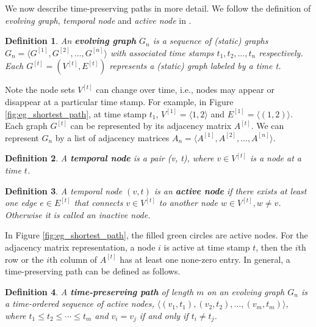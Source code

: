 \documentclass[12pt]{article}
\newtheorem{definition}{Definition}
\theoremstyle{definition}
\begin{document}
We now describe time-preserving paths in more detail. We follow the definition of
\emph{evolving graph}, \emph{temporal node} and \emph{active node} in \cite{chen16}.

\begin{definition}
  An \textbf{evolving graph} $G_n$ is a sequence of (static) graphs
$G_n = \langle G^{[1]}, G^{[2]},  \ldots ,G^{[n]} \rangle$ with associated time stamps
$t_1, t_2, \ldots, t_n$ respectively. Each $G^{[t]} = (V^{[t]}, E^{[t]})$ represents a (static) graph labeled by a time t.
\end{definition}

Note the node sets $V^{[t]}$ can change over time, i.e., nodes may appear or disappear at a particular time stamp.
For example, in Figure \ref{fig:eg_shortest_path}, at time stamp $t_1$, $V^{[1]} = \langle 1, 2 \rangle$ and $E^{[1]} = \langle (1,2) \rangle$. Each graph $G^{[t]}$ can be represented by its adjacency matrix $A^{[t]}$.
We can represent $G_n$ by a list of adjacency matrices $A_n = \langle A^{[1]}, A^{[2]}, \ldots, A^{[n]} \rangle$.


\begin{definition}
  A \textbf{temporal node} is a pair (v, t), where $v \in V^{[t]}$ is a node at a time $t$.
\end{definition}


\begin{definition}
  A temporal node $(v, t)$ is an \textbf{active node} if there exists at least one edge $e \in E^{[t]}$ that connects $v \in V^{[t]}$ to another node $w \in V^{[t]}, w\ne v$. Otherwise it is called an inactive node.
\end{definition}

In Figure \ref{fig:eg_shortest_path}, the filled green circles are active nodes. For the adjacency matrix representation, a node $i$ is active at time stamp $t$, then
the $i$th row or the $i$th column of $A^{[t]}$ has at least one none-zero entry.
 In general, a time-preserving path can be defined as follows.

\begin{definition}
A \textbf{time-preserving path}  of length $m$ on an evolving graph $G_n$ is a time-ordered sequence of active nodes, $\langle (v_1, t_1), (v_2, t_2), \ldots, (v_m, t_m) \rangle$, where $t_1 \le t_2 \le \cdots \le t_m$ and
$v_i = v_j$ if and only if $t_i \ne t_j$.
\end{definition}
\end{document}
